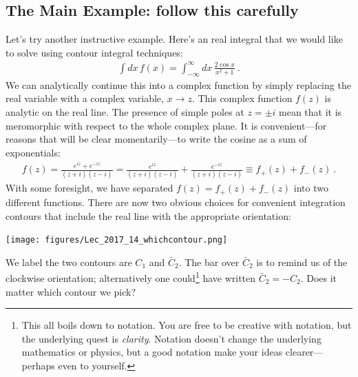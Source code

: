 \subsection{The Main Example: follow this carefully}
Let's try another instructive example. Here's an real integral that we would like to solve using contour integral techniques:
\begin{align}
\int dx\, f(x) = \int_{-\infty}^\infty  dx\,
\frac{2\cos x}{x^2+1} \ .
\end{align}
We can analytically continue this into a complex function by simply replacing the real variable with a complex variable, $x\to z$. This complex function $f(z)$ is analytic on the real line. The presence of simple poles at $z=\pm i$ mean that it is meromorphic with respect to the whole complex plane. It is convenient---for reasons that will be clear momentarily---to write the cosine as a sum of exponentials:
\begin{align}
	f(z) 
	= \frac{e^{iz}+e^{-iz}}{(z+i)(z-i)} 
	= \frac{e^{iz}}{(z+i)(z-i)} + \frac{e^{-iz}}{(z+i)(z-i)} 
	\equiv f_+(z) + f_-(z)
	\ .
\end{align}
With some foresight, we have separated $f(z)=f_+(z)+f_-(z)$ into two different functions. 
%
There are now two obvious choices for convenient integration contours that include the real line with the appropriate orientation:
\begin{center}
\texttt{[image: figures/Lec\_2017\_14\_whichcontour.png]}
\end{center}
We label the two contours are $C_1$ and $\bar C_2$. The bar over $\bar C_2$ is to remind us of the clockwise orientation; alternatively one could\footnote{This all boils down to notation. You are free to be creative with notation, but the underlying quest is \emph{clarity}. Notation doesn't change the underlying mathematics or physics, but a good notation make your ideas clearer---perhaps even to yourself.} have written $\bar C_2 = -C_2$.  Does it matter which contour we pick?

